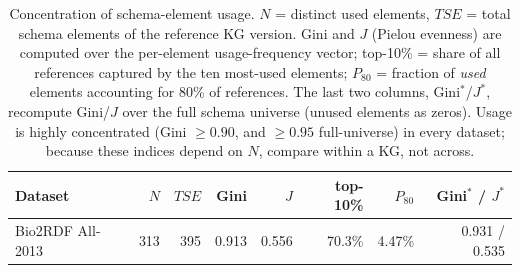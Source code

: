 \documentclass[sw]{iosart2x}
\providecommand{\DIFaddbeginFL}{} %
\providecommand{\DIFdelbeginFL}{} %
\providecommand{\DIFdelendFL}{} %
\providecommand{\DIFscaledelfig}{0.5}
\newlength{\DIFdelgraphicswidth} %
\newlength{\DIFdelgraphicsheight} %
\providecommand{\DIFaddincludegraphics}[2][]{{\color{blue}\fbox{\DIFOincludegraphics[#1]{#2}}}} %
\providecommand{\DIFdelincludegraphics}[2][]{%
\sbox{\DIFdelgraphicsbox}{\DIFOincludegraphics[#1]{#2}}%
\settoboxwidth{\DIFdelgraphicswidth}{\DIFdelgraphicsbox} %
\settoboxtotalheight{\DIFdelgraphicsheight}{\DIFdelgraphicsbox} %
\scalebox{\DIFscaledelfig}{%
\parbox[b]{\DIFdelgraphicswidth}{\usebox{\DIFdelgraphicsbox}\\[-\baselineskip] \rule{\DIFdelgraphicswidth}{0em}}\llap{\resizebox{\DIFdelgraphicswidth}{\DIFdelgraphicsheight}{%
\setlength{\unitlength}{\DIFdelgraphicswidth}%
\begin{picture}(1,1)%
\thicklines\linethickness{2pt} %
{\color[rgb]{1,0,0}\put(0,0){\framebox(1,1){}}}%
{\color[rgb]{1,0,0}\put(0,0){\line( 1,1){1}}}%
{\color[rgb]{1,0,0}\put(0,1){\line(1,-1){1}}}%
\end{picture}%
}\hspace*{3pt}}} %
} %
\DeclareRobustCommand{\DIFaddbeginFL}{\DIFOaddbeginFL \let\includegraphics\DIFaddincludegraphics} %
\DeclareRobustCommand{\DIFdelbeginFL}{\DIFOdelbeginFL \let\includegraphics\DIFdelincludegraphics} %
\DeclareRobustCommand{\DIFdelendFL}{\DIFOaddendFL \let\includegraphics\DIFOincludegraphics} %
\begin{document}
\begin{table}[ht]
\centering
\caption{Concentration of schema-element usage. $N$ = distinct used elements, $TSE$ = total schema elements of the reference KG version. Gini and $J$ (Pielou evenness) are computed over the per-element usage-frequency vector; top-10\% = share of all references captured by the ten most-used elements; $P_{80}$ = fraction of \emph{used} elements accounting for 80\% of references. The last two columns, Gini$^{\ast}$/$J^{\ast}$, recompute Gini/$J$ over the full schema universe (unused elements as zeros). Usage is highly concentrated (Gini $\geq 0.90$, and $\geq 0.95$ full-universe) in every dataset; because these indices depend on $N$, compare within a KG, not across.}
\label{tab:concentration}
\DIFdelbeginFL %
\DIFdelendFL \DIFaddbeginFL \begin{tabular}{l|r|r|r|r|r|r|r}
\hline
Dataset & $N$ & $TSE$ & Gini & $J$ & top-10\% & $P_{80}$ & Gini$^{\ast}$ / $J^{\ast}$ \\
\hline
Bio2RDF All-2013 & 313 & 395 & 0.913 & 0.556 & 70.3\% & 4.47\% & 0.931 / 0.535 \\

\end{tabular}
\end{table}
\end{document}

